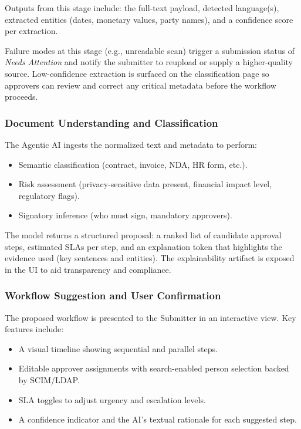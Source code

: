 \documentclass[12pt,oneside,openright,a4paper]{cpe-english-project}
\begin{document}
Outputs from this stage include: the full-text payload, detected
language(s), extracted entities (dates, monetary values, party names),
and a confidence score per extraction.

Failure modes at this stage (e.g., unreadable scan) trigger a
submission status of \emph{Needs Attention} and notify the submitter to
reupload or supply a higher-quality source. Low-confidence extraction
is surfaced on the classification page so approvers can review and
correct any critical metadata before the workflow proceeds.

\subsubsection{Document Understanding and Classification}

The Agentic AI ingests the normalized text and metadata to perform:

\begin{itemize}
  \item Semantic classification (contract, invoice, NDA, HR form, etc.).
  \item Risk assessment (privacy-sensitive data present, financial
    impact level, regulatory flags).
  \item Signatory inference (who must sign, mandatory approvers).
\end{itemize}

The model returns a structured proposal: a ranked list of candidate
approval steps, estimated SLAs per step, and an explanation token that
highlights the evidence used (key sentences and entities). The
explainability artifact is exposed in the UI to aid transparency and
compliance.

\subsubsection{Workflow Suggestion and User Confirmation}

The proposed workflow is presented to the Submitter in an interactive
view. Key features include:

\begin{itemize}
  \item A visual timeline showing sequential and parallel steps.
  \item Editable approver assignments with search-enabled person
    selection backed by SCIM/LDAP.
  \item SLA toggles to adjust urgency and escalation levels.
  \item A confidence indicator and the AI's textual rationale for
    each suggested step.
\end{itemize}
\end{document}
